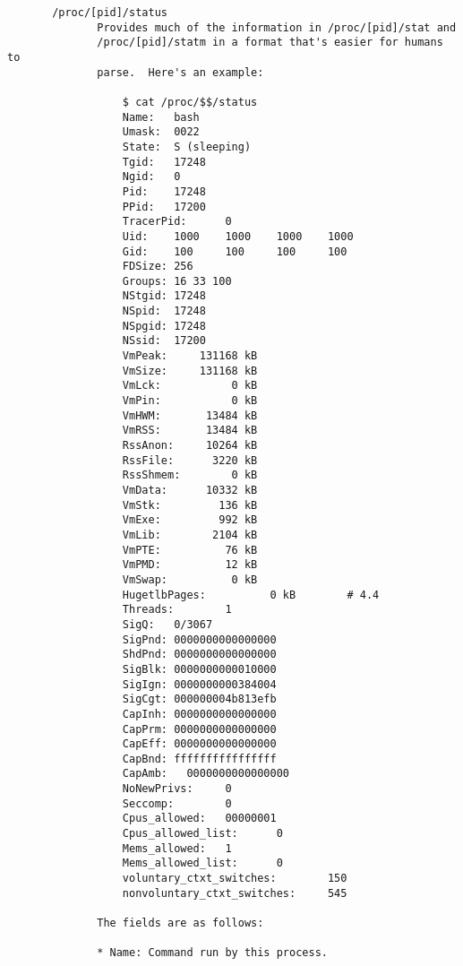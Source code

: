 \documentclass[]{article}
\begin{document}
\begin{verbatim}
       /proc/[pid]/status
              Provides much of the information in /proc/[pid]/stat and
              /proc/[pid]/statm in a format that's easier for humans to
              parse.  Here's an example:

                  $ cat /proc/$$/status
                  Name:   bash
                  Umask:  0022
                  State:  S (sleeping)
                  Tgid:   17248
                  Ngid:   0
                  Pid:    17248
                  PPid:   17200
                  TracerPid:      0
                  Uid:    1000    1000    1000    1000
                  Gid:    100     100     100     100
                  FDSize: 256
                  Groups: 16 33 100
                  NStgid: 17248
                  NSpid:  17248
                  NSpgid: 17248
                  NSsid:  17200
                  VmPeak:     131168 kB
                  VmSize:     131168 kB
                  VmLck:           0 kB
                  VmPin:           0 kB
                  VmHWM:       13484 kB
                  VmRSS:       13484 kB
                  RssAnon:     10264 kB
                  RssFile:      3220 kB
                  RssShmem:        0 kB
                  VmData:      10332 kB
                  VmStk:         136 kB
                  VmExe:         992 kB
                  VmLib:        2104 kB
                  VmPTE:          76 kB
                  VmPMD:          12 kB
                  VmSwap:          0 kB
                  HugetlbPages:          0 kB        # 4.4
                  Threads:        1
                  SigQ:   0/3067
                  SigPnd: 0000000000000000
                  ShdPnd: 0000000000000000
                  SigBlk: 0000000000010000
                  SigIgn: 0000000000384004
                  SigCgt: 000000004b813efb
                  CapInh: 0000000000000000
                  CapPrm: 0000000000000000
                  CapEff: 0000000000000000
                  CapBnd: ffffffffffffffff
                  CapAmb:   0000000000000000
                  NoNewPrivs:     0
                  Seccomp:        0
                  Cpus_allowed:   00000001
                  Cpus_allowed_list:      0
                  Mems_allowed:   1
                  Mems_allowed_list:      0
                  voluntary_ctxt_switches:        150
                  nonvoluntary_ctxt_switches:     545

              The fields are as follows:

              * Name: Command run by this process.


\end{verbatim}
\end{document}
